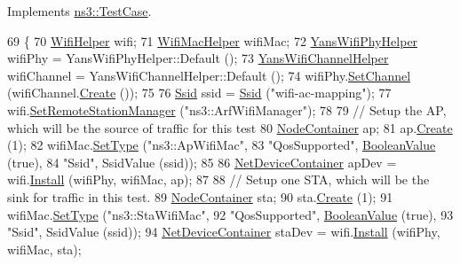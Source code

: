 Implements \hyperlink{classns3_1_1TestCase_a8ff74680cf017ed42011e4be51917a24}{ns3\+::\+Test\+Case}.


\begin{DoxyCode}
69 \{
70   \hyperlink{classns3_1_1WifiHelper}{WifiHelper} wifi;
71   \hyperlink{classns3_1_1WifiMacHelper}{WifiMacHelper} wifiMac;
72   \hyperlink{classns3_1_1YansWifiPhyHelper}{YansWifiPhyHelper} wifiPhy = YansWifiPhyHelper::Default ();
73   \hyperlink{classns3_1_1YansWifiChannelHelper}{YansWifiChannelHelper} wifiChannel = YansWifiChannelHelper::Default ();
74   wifiPhy.\hyperlink{classns3_1_1YansWifiPhyHelper_ad2e9a27587dd4ff320435c93cc2676de}{SetChannel} (wifiChannel.\hyperlink{classns3_1_1YansWifiChannelHelper_a0532e292ab9452f3cf630c848708e563}{Create} ());
75 
76   \hyperlink{classns3_1_1Ssid}{Ssid} ssid = \hyperlink{classns3_1_1Ssid}{Ssid} (\textcolor{stringliteral}{"wifi-ac-mapping"});
77   wifi.\hyperlink{classns3_1_1WifiHelper_a3d01b178aeb2de246ab5a3aa5638ce24}{SetRemoteStationManager} (\textcolor{stringliteral}{"ns3::ArfWifiManager"});
78 
79   \textcolor{comment}{// Setup the AP, which will be the source of traffic for this test}
80   \hyperlink{classns3_1_1NodeContainer}{NodeContainer} ap;
81   ap.\hyperlink{classns3_1_1NodeContainer_a787f059e2813e8b951cc6914d11dfe69}{Create} (1);
82   wifiMac.\hyperlink{classns3_1_1WifiMacHelper_a382d8df76a1dd7007179d1963b4b6bc6}{SetType} (\textcolor{stringliteral}{"ns3::ApWifiMac"},
83                    \textcolor{stringliteral}{"QosSupported"}, \hyperlink{classns3_1_1BooleanValue}{BooleanValue} (\textcolor{keyword}{true}),
84                    \textcolor{stringliteral}{"Ssid"}, SsidValue (ssid));
85 
86   \hyperlink{classns3_1_1NetDeviceContainer}{NetDeviceContainer} apDev = wifi.\hyperlink{classns3_1_1WifiHelper_a451b3d33fa1497c22f06c5451f57a127}{Install} (wifiPhy, wifiMac, ap);
87 
88   \textcolor{comment}{// Setup one STA, which will be the sink for traffic in this test.}
89   \hyperlink{classns3_1_1NodeContainer}{NodeContainer} sta;
90   sta.\hyperlink{classns3_1_1NodeContainer_a787f059e2813e8b951cc6914d11dfe69}{Create} (1);
91   wifiMac.\hyperlink{classns3_1_1WifiMacHelper_a382d8df76a1dd7007179d1963b4b6bc6}{SetType} (\textcolor{stringliteral}{"ns3::StaWifiMac"},
92                    \textcolor{stringliteral}{"QosSupported"}, \hyperlink{classns3_1_1BooleanValue}{BooleanValue} (\textcolor{keyword}{true}),
93                    \textcolor{stringliteral}{"Ssid"}, SsidValue (ssid));
94   \hyperlink{classns3_1_1NetDeviceContainer}{NetDeviceContainer} staDev = wifi.\hyperlink{classns3_1_1WifiHelper_a451b3d33fa1497c22f06c5451f57a127}{Install} (wifiPhy, wifiMac, sta);

\end{DoxyCode}
